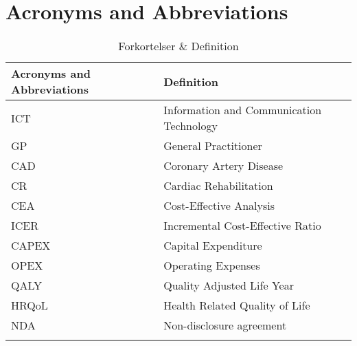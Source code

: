 \chapter{Acronyms and Abbreviations}


\begin{longtabu} to 
	\textbf{Acronyms and Abbreviations} & \textbf{Definition}\\[-1ex]
	\midrule
	ICT & Information and Communication Technology \\[-1ex]
	GP & General Practitioner \\[-1ex]
	CAD & Coronary Artery Disease \\[-1ex]
	CR & Cardiac Rehabilitation \\[-1ex]
	CEA & Cost-Effective Analysis \\[-1ex]
	ICER & Incremental Cost-Effective Ratio \\[-1ex]
	CAPEX & Capital Expenditure \\[-1ex]
	OPEX & Operating Expenses \\[-1ex]
	QALY & Quality Adjusted Life Year \\[-1ex]
	HRQoL & Health Related Quality of Life \\[-1ex]
	NDA & Non-disclosure agreement \\[-1ex]
	\caption{Forkortelser \& Definition}
\end{longtabu}



